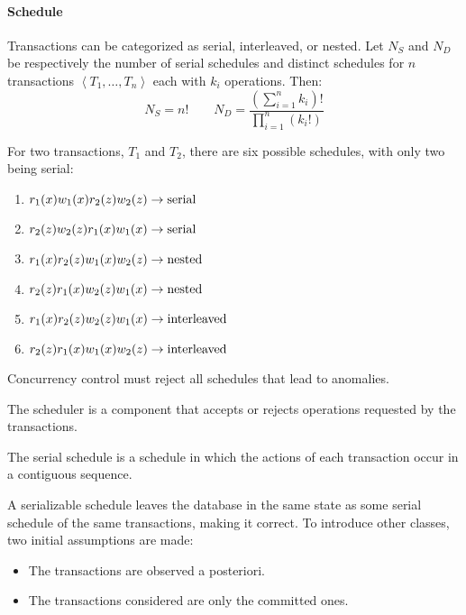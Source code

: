 \paragraph*{Schedule}
Transactions can be categorized as serial, interleaved, or nested. 
Let $N_S$ and $N_D$ be respectively the number of serial schedules and distinct schedules for $n$ transactions $\left\langle T_1,\dots,T_n\right\rangle $ each with $k_i$ operations. 
Then:
\[N_S=n! \qquad N_D=\dfrac{\left( \sum_{i=1}^nk_i \right)!}{\prod_{i=1}^n \left( k_i! \right)}\]
\begin{example}
    For two transactions, $T_1$ and $T_2$, there are six possible schedules, with only two being serial:
    \begin{enumerate}
        \item $r_1(x) w_1(x) r_2(z) w_2(z) \rightarrow \textnormal{serial}$
        \item $r_2(z) w_2(z) r_1(x) w_1(x) \rightarrow \textnormal{serial}$
        \item $r_1(x) r_2(z) w_1(x) w_2(z) \rightarrow \textnormal{nested}$
        \item $r_2(z) r_1(x) w_2(z) w_1(x) \rightarrow \textnormal{nested}$
        \item $r_1(x) r_2(z) w_2(z) w_1(x) \rightarrow \textnormal{interleaved}$
        \item $r_2(z) r_1(x) w_1(x) w_2(z) \rightarrow \textnormal{interleaved}$
    \end{enumerate}
\end{example}
Concurrency control must reject all schedules that lead to anomalies.
\begin{definition}
    The scheduler is a component that accepts or rejects operations requested by the transactions. 
\end{definition}
\begin{definition}
    The serial schedule is a schedule in which the actions of each transaction occur in a contiguous sequence.
\end{definition}
A serializable schedule leaves the database in the same state as some serial schedule of the same transactions, making it correct. 
To introduce other classes, two initial assumptions are made:
\begin{itemize}
    \item The transactions are observed a posteriori. 
    \item The transactions considered are only the committed ones. 
\end{itemize}